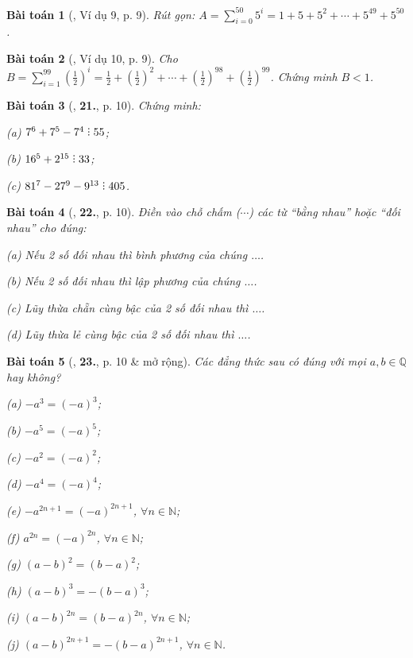\documentclass{article}
\numberwithin{equation}{section}
\newtheorem{baitoan}{Bài toán}[section]
\DeclareRobustCommand{\divby}{%
	\mathrel{\vbox{\baselineskip.65ex\lineskiplimit0pt\hbox{.}\hbox{.}\hbox{.}}}%
}
\begin{document}
\begin{baitoan}[\cite{Binh_Toan_7_tap_1}, Ví dụ 9, p. 9]
	Rút gọn: $A = \sum_{i=0}^{50} 5^i = 1 + 5 + 5^2 + \cdots + 5^{49} + 5^{50}$.
\end{baitoan}

\begin{baitoan}[\cite{Binh_Toan_7_tap_1}, Ví dụ 10, p. 9]
	Cho $B = \sum_{i=1}^{99} \left(\frac{1}{2}\right)^i = \frac{1}{2} + \left(\frac{1}{2}\right)^2 + \cdots + \left(\frac{1}{2}\right)^{98} + \left(\frac{1}{2}\right)^{99}$. Chứng minh $B < 1$.
\end{baitoan}

\begin{baitoan}[\cite{Binh_Toan_7_tap_1}, \textbf{21.}, p. 10]
	Chứng minh:
	\begin{enumerate*}
		\item[(a)] $7^6 + 7^5 - 7^4\divby 55$;
		\item[(b)] $16^5 + 2^{15}\divby 33$;
		\item[(c)] $81^7 - 27^9 - 9^{13}\divby 405$.
	\end{enumerate*}
\end{baitoan}

\begin{baitoan}[\cite{Binh_Toan_7_tap_1}, \textbf{22.}, p. 10]
	Điền vào chỗ chấm ($\cdots$) các từ ``bằng nhau'' hoặc ``đối nhau'' cho đúng:
	\begin{enumerate*}
		\item[(a)] Nếu 2 số đối nhau thì bình phương của chúng $\ldots$.
		\item[(b)] Nếu 2 số đối nhau thì lập phương của chúng $\ldots$.
		\item[(c)] Lũy thừa chẵn cùng bậc của 2 số đối nhau thì $\ldots$.
		\item[(d)] Lũy thừa lẻ cùng bậc của 2 số đối nhau thì $\ldots$.
	\end{enumerate*}
\end{baitoan}

\begin{baitoan}[\cite{Binh_Toan_7_tap_1}, \textbf{23.}, p. 10 \& mở rộng]
	Các đẳng thức sau có đúng với mọi $a,b\in\mathbb{Q}$ hay không?
	\begin{enumerate*}
		\item[(a)] $-a^3 = (-a)^3$;
		\item[(b)] $-a^5 = (-a)^5$;
		\item[(c)] $-a^2 = (-a)^2$;
		\item[(d)] $-a^4 = (-a)^4$;
		\item[(e)] $-a^{2n+1} = (-a)^{2n+1}$, $\forall n\in\mathbb{N}$;
		\item[(f)] $a^{2n} = (-a)^{2n}$, $\forall n\in\mathbb{N}$;
		\item[(g)] $(a - b)^2 = (b - a)^2$;
		\item[(h)] $(a - b)^3 = -(b - a)^3$;
		\item[(i)] $(a - b)^{2n} = (b - a)^{2n}$, $\forall n\in\mathbb{N}$;
		\item[(j)] $(a - b)^{2n+1} = -(b - a)^{2n+1}$, $\forall n\in\mathbb{N}$.
	\end{enumerate*}
\end{baitoan}
\end{document}
